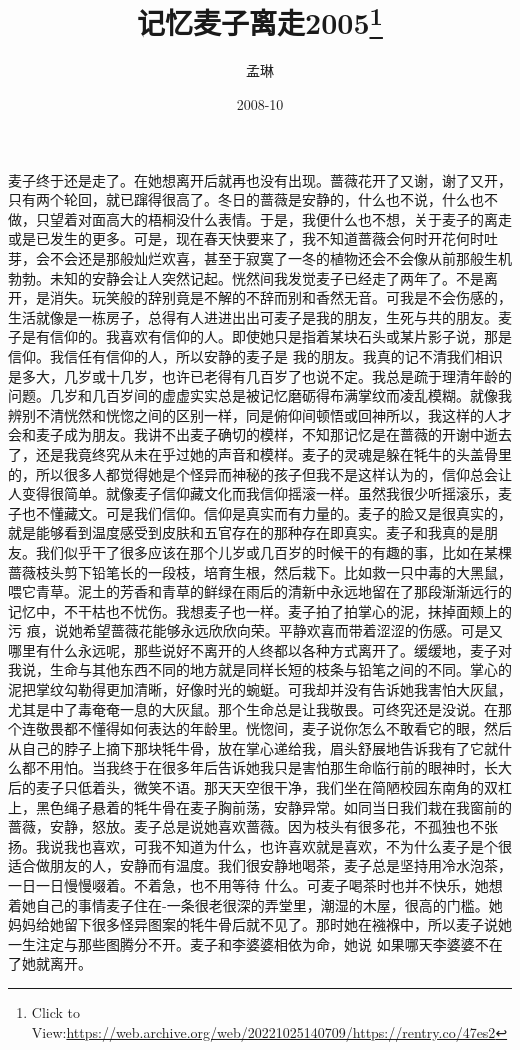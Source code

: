 \documentclass{article}
\title{记忆麦子离走2005\footnote{Click to View:\url{https://web.archive.org/web/20221025140709/https://rentry.co/47es2}}}
\author{孟琳}
\date{2008-10}
\begin{document}

\maketitle


\Large

﻿麦子终于还是走了。在她想离开后就再也没有出现。蔷薇花开了又谢，谢了又开，只有两个轮回，就已蹿得很高了。冬日的蔷薇是安静的，什么也不说，什么也不做，只望着对面高大的梧桐没什么表情。于是，我便什么也不想，关于麦子的离走或是已发生的更多。可是，现在春天快要来了，我不知道蔷薇会何时开花何时吐芽，会不会还是那般灿烂欢喜，甚至于寂寞了一冬的植物还会不会像从前那般生机勃勃。未知的安静会让人突然记起。恍然间我发觉麦子已经走了两年了。不是离开，是消失。玩笑般的辞别竟是不解的不辞而别和香然无音。可我是不会伤感的，生活就像是一栋房子，总得有人进进出出可麦子是我的朋友，生死与共的朋友。麦子是有信仰的。我喜欢有信仰的人。即使她只是指着某块石头或某片影子说，那是信仰。我信任有信仰的人，所以安静的麦子是
\newpage
我的朋友。我真的记不清我们相识是多大，几岁或十几岁，也许已老得有几百岁了也说不定。我总是疏于理清年龄的问题。几岁和几百岁间的虚虚实实总是被记忆磨砺得布满掌纹而凌乱模糊。就像我辨别不清恍然和恍惚之间的区别一样，同是俯仰间顿悟或回神所以，我这样的人才会和麦子成为朋友。我讲不出麦子确切的模样，不知那记忆是在蔷薇的开谢中逝去了，还是我竟终究从未在乎过她的声音和模样。麦子的灵魂是躲在牦牛的头盖骨里的，所以很多人都觉得她是个怪异而神秘的孩子但我不是这样认为的，信仰总会让人变得很简单。就像麦子信仰藏文化而我信仰摇滚一样。虽然我很少听摇滚乐，麦子也不懂藏文。可是我们信仰。信仰是真实而有力量的。麦子的脸又是很真实的，就是能够看到温度感受到皮肤和五官存在的那种存在即真实。麦子和我真的是朋友。我们似乎干了很多应该在那个儿岁或几百岁的时候干的有趣的事，比如在某棵蔷薇枝头剪下铅笔长的一段枝，培育生根，然后栽下。比如救一只中毒的大黑鼠，喂它青草。泥土的芳香和青草的鲜绿在雨后的清新中永远地留在了那段渐渐远行的记忆中，不干枯也不忧伤。我想麦子也一样。麦子拍了拍掌心的泥，抹掉面颊上的污
\newpage
痕，说她希望蔷薇花能够永远欣欣向荣。平静欢喜而带着涩涩的伤感。可是又哪里有什么永远呢，那些说好不离开的人终都以各种方式离开了。缓缓地，麦子对我说，生命与其他东西不同的地方就是同样长短的枝条与铅笔之间的不同。掌心的泥把掌纹勾勒得更加清晰，好像时光的蜿蜓。可我却并没有告诉她我害怕大灰鼠，尤其是中了毒奄奄一息的大灰鼠。那个生命总是让我敬畏。可终究还是没说。在那个连敬畏都不懂得如何表达的年龄里。恍惚间，麦子说你怎么不敢看它的眼，然后从自己的脖子上摘下那块牦牛骨，放在掌心递给我，眉头舒展地告诉我有了它就什么都不用怕。当我终于在很多年后告诉她我只是害怕那生命临行前的眼神时，长大后的麦子只低着头，微笑不语。那天天空很干净，我们坐在简陋校园东南角的双杠上，黑色绳子悬着的牦牛骨在麦子胸前荡，安静异常。如同当日我们栽在我窗前的蔷薇，安静，怒放。麦子总是说她喜欢蔷薇。因为枝头有很多花，不孤独也不张扬。我说我也喜欢，可我不知道为什么，也许喜欢就是喜欢，不为什么麦子是个很适合做朋友的人，安静而有温度。我们很安静地喝茶，麦子总是坚持用冷水泡茶，一日一日慢慢啜着。不着急，也不用等待
\newpage
什么。可麦子喝茶时也并不快乐，她想着她自己的事情麦子住在-一条很老很深的弄堂里，潮湿的木屋，很高的门槛。她妈妈给她留下很多怪异图案的牦牛骨后就不见了。那时她在襁褓中，所以麦子说她一生注定与那些图腾分不开。麦子和李婆婆相依为命，她说
如果哪天李婆婆不在了她就离开。 
\end{document}
